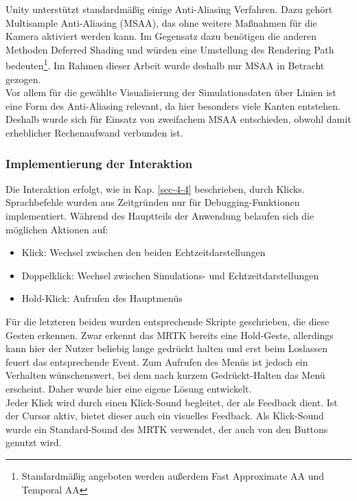 Unity unterstützt standardmäßig einige Anti-Aliasing Verfahren. Dazu gehört Multisample Anti-Aliasing (MSAA), das ohne weitere Maßnahmen für die Kamera aktiviert werden kann. Im Gegensatz dazu benötigen die anderen Methoden Deferred Shading und würden eine Umstellung des Rendering Path bedeuten\footnote{Standardmäßig angeboten werden außerdem Fast Approximate AA und Temporal AA}. Im Rahmen dieser Arbeit wurde deshalb nur MSAA in Betracht gezogen.\\

Vor allem für die gewählte Visualisierung der Simulationsdaten über Linien ist eine Form des Anti-Aliasing relevant, da hier besonders viele Kanten entstehen. Deshalb wurde sich für Einsatz von zweifachem MSAA entschieden, obwohl damit erheblicher Rechenaufwand verbunden ist.

\subsubsection{Implementierung der Interaktion}

Die Interaktion erfolgt, wie in Kap. \ref{sec-4-4} beschrieben, durch Klicks. Sprachbefehle wurden aus Zeitgründen nur für Debugging-Funktionen implementiert. 
Während des Hauptteils der Anwendung belaufen sich die möglichen Aktionen auf:

\begin{itemize}
	\setlength{\itemsep}{-1pt}
	\singlespacing
	\item Klick: Wechsel zwischen den beiden Echtzeitdarstellungen
	\item Doppelklick: Wechsel zwischen Simulations- und Echtzeitdarstellungen
	\item Hold-Klick: Aufrufen des Hauptmenüs
\end{itemize}

Für die letzteren beiden wurden entsprechende Skripte geschrieben, die diese Gesten erkennen. Zwar erkennt das MRTK bereits eine Hold-Geste, allerdings kann hier der Nutzer beliebig lange gedrückt halten und erst beim Loslassen feuert das entsprechende Event. Zum Aufrufen des Menüs ist jedoch ein Verhalten wünschenswert, bei dem nach kurzem Gedrückt-Halten das Menü erscheint. Daher wurde hier eine eigene Lösung entwickelt.\\

Jeder Klick wird durch einen Klick-Sound begleitet, der als Feedback dient. Ist der Cursor aktiv, bietet dieser auch ein visuelles Feedback. Als Klick-Sound wurde ein Standard-Sound des MRTK verwendet, der auch von den Buttons genutzt wird.\\

